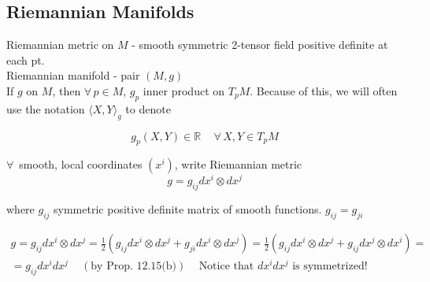%                                                              
%

\subsection*{Riemannian Manifolds}

Riemannian metric on $M$ - smooth symmetric 2-tensor field positive definite at each pt.   \\

Riemannian manifold - pair $(M,g)$ \\

If $g$ on $M$, then $\forall \, p \in M$, $g_p$ inner product on $T_pM$.  Because of this, we will often use the notation $\langle X, Y\rangle_g$ to denote 

\[
g_p(X,Y) \in \mathbb{R} \quad \, \forall \, X, Y \in T_pM
\]

$\forall \, $ smooth, local coordinates $(x^i)$, write Riemannian metric
\[
g=g_{ij} dx^i \otimes dx^j
\]

where $g_{ij}$ symmetric positive definite matrix of smooth functions.  $g_{ij} = g_{ji}$

\[
\begin{gathered}
  g = g_{ij} dx^i \otimes dx^j = \frac{1}{2} (g_{ij} dx^i \otimes dx^j + g_{ji} dx^i \otimes dx^j ) = \frac{1}{2} (g_{ij} dx^i \otimes dx^j + g_{ij} dx^j \otimes dx^i ) = \\
  = g_{ij} dx^i dx^j \quad \, (\text{by Prop. 12.15(b)}) \quad \, \text{Notice that $dx^idx^j$ is symmetrized!}
\end{gathered}
\]


